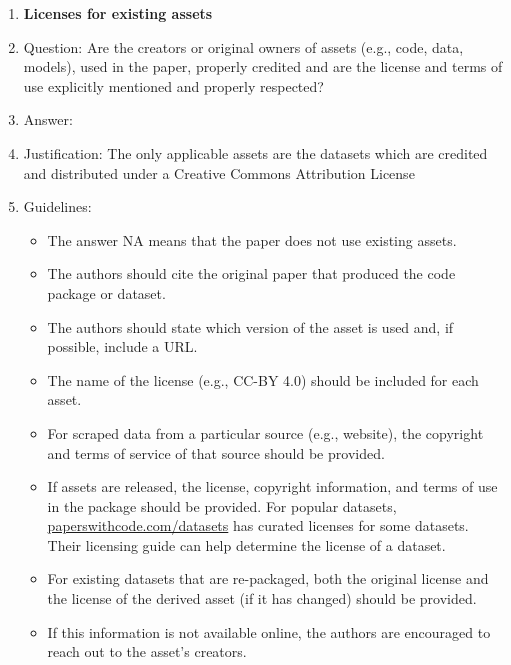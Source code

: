 \documentclass{article}
\begin{document}
\begin{enumerate}
\item {\bf Licenses for existing assets}
    \item[] Question: Are the creators or original owners of assets (e.g., code, data, models), used in the paper, properly credited and are the license and terms of use explicitly mentioned and properly respected?
    \item[] Answer: \answerYes{} %
    \item[] Justification: The only applicable assets are the datasets which are credited and distributed under a Creative Commons Attribution License
    \item[] Guidelines:
    \begin{itemize}
        \item The answer NA means that the paper does not use existing assets.
        \item The authors should cite the original paper that produced the code package or dataset.
        \item The authors should state which version of the asset is used and, if possible, include a URL.
        \item The name of the license (e.g., CC-BY 4.0) should be included for each asset.
        \item For scraped data from a particular source (e.g., website), the copyright and terms of service of that source should be provided.
        \item If assets are released, the license, copyright information, and terms of use in the package should be provided. For popular datasets, \url{paperswithcode.com/datasets} has curated licenses for some datasets. Their licensing guide can help determine the license of a dataset.
        \item For existing datasets that are re-packaged, both the original license and the license of the derived asset (if it has changed) should be provided.
        \item If this information is not available online, the authors are encouraged to reach out to the asset's creators.
    \end{itemize}


\end{enumerate}
\end{document}
